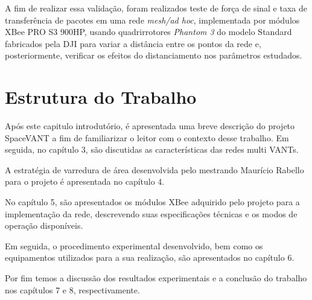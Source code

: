 A fim de realizar essa validação, foram realizados teste de força de sinal e taxa de transferência de pacotes em uma rede \emph{mesh/ad hoc}, implementada por módulos XBee PRO S3 900HP, usando quadrirrotores \emph{Phantom 3} do modelo Standard fabricados pela DJI\textsuperscript{\texttrademark} para variar a distância entre os pontos da rede e, posteriormente, verificar os efeitos do distanciamento nos parâmetros estudados.

\section{Estrutura do Trabalho}

Após este capitulo introdutório, é apresentada uma breve descrição do projeto SpaceVANT a fim de familiarizar o leitor com o contexto desse trabalho. Em seguida, no capítulo 3, são discutidas as características das redes multi VANTs. 

A estratégia de varredura de área desenvolvida pelo mestrando Maurício Rabello para o projeto é apresentada no capítulo 4. 

No capítulo 5, são apresentados os módulos XBee adquirido pelo projeto para a implementação da rede, descrevendo suas especificações técnicas e os modos de operação disponíveis. 

Em seguida, o procedimento experimental desenvolvido, bem como os equipamentos utilizados para a sua realização, são apresentados no capítulo 6.

Por fim temos a discussão dos resultados experimentais e a conclusão do trabalho nos capítulos 7 e 8, respectivamente.  
